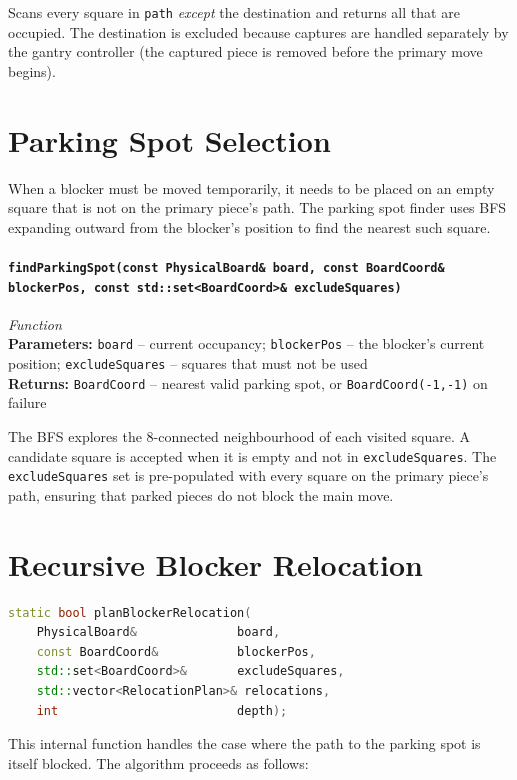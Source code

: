 \documentclass[11pt,a4paper]{report}
\newcommand{\function}[4]{%
    \paragraph{\texttt{#1}} \hfill \textit{#2}\\
    \textbf{Parameters:} #3\\
    \textbf{Returns:} #4
}
\begin{document}
Scans every square in \texttt{path} \emph{except} the destination and returns all that are occupied. The destination is excluded because captures are handled separately by the gantry controller (the captured piece is removed before the primary move begins).

\section{Parking Spot Selection}

When a blocker must be moved temporarily, it needs to be placed on an empty square that is not on the primary piece's path. The parking spot finder uses BFS expanding outward from the blocker's position to find the nearest such square.

\function{findParkingSpot(const PhysicalBoard\& board, const BoardCoord\& blockerPos, const std::set<BoardCoord>\& excludeSquares)}{Function}{\texttt{board} -- current occupancy; \texttt{blockerPos} -- the blocker's current position; \texttt{excludeSquares} -- squares that must not be used}{\texttt{BoardCoord} -- nearest valid parking spot, or \texttt{BoardCoord(-1,-1)} on failure}

The BFS explores the 8-connected neighbourhood of each visited square. A candidate square is accepted when it is empty and not in \texttt{excludeSquares}. The \texttt{excludeSquares} set is pre-populated with every square on the primary piece's path, ensuring that parked pieces do not block the main move.

\section{Recursive Blocker Relocation}

\begin{lstlisting}[language=C++, caption={Blocker relocation signature (internal)}]
static bool planBlockerRelocation(
    PhysicalBoard&              board,
    const BoardCoord&           blockerPos,
    std::set<BoardCoord>&       excludeSquares,
    std::vector<RelocationPlan>& relocations,
    int                         depth);
\end{lstlisting}

This internal function handles the case where the path to the parking spot is itself blocked. The algorithm proceeds as follows:
\end{document}
